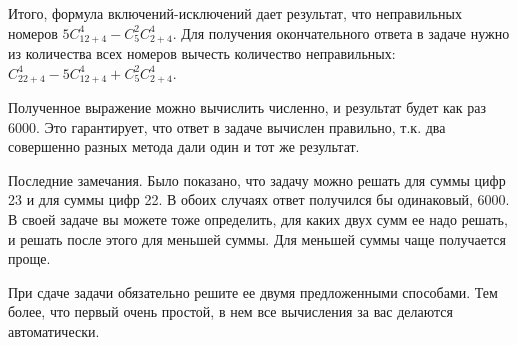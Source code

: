 \documentclass{article}
\begin{document}
Итого, формула включений-исключений дает результат, что неправильных номеров $5C_{12+4}^4-C_5^2C_{2 + 4}^4$. Для получения окончательного ответа в задаче нужно из количества всех номеров вычесть количество неправильных: $C_{22+4}^4-5C_{12+4}^4+C_5^2C_{2 + 4}^4$.

Полученное выражение можно вычислить численно, и результат будет как раз 6000. Это гарантирует, что ответ в задаче вычислен правильно, т.к. два совершенно разных метода дали один и тот же результат.

Последние замечания. Было показано, что задачу можно решать для суммы цифр 23 и для суммы цифр 22. В обоих случаях ответ получился бы одинаковый, 6000. В своей задаче вы можете тоже определить, для каких двух сумм ее надо решать, и решать после этого для меньшей суммы. Для меньшей суммы чаще получается проще.

При сдаче задачи обязательно решите ее двумя предложенными способами. Тем более, что первый очень простой, в нем все вычисления за вас делаются автоматически.
\end{document}
